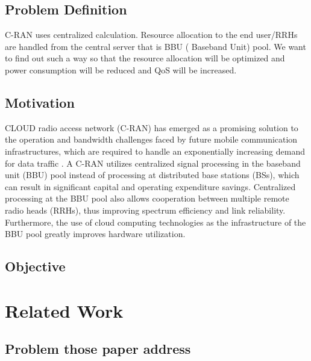 \documentclass{article}
\begin{document}
\subsection{Problem Definition}
C-RAN uses centralized calculation. Resource allocation to the end user/RRHs are handled from the central server that is BBU ( Baseband Unit) pool. We want to find out such a way so that the resource allocation will be optimized and power consumption will be reduced and QoS will be increased.
\subsection{Motivation}
CLOUD radio access network (C-RAN) has emerged as a promising solution to the operation and bandwidth challenges faced by future mobile communication infrastructures, which are required to handle an exponentially increasing demand for data traffic . A C-RAN utilizes centralized signal processing in the baseband unit (BBU) pool instead of processing at distributed base stations (BSs), which can result in significant capital and operating expenditure savings. Centralized processing at the BBU pool also allows cooperation between multiple remote radio heads (RRHs), thus improving spectrum efficiency and link reliability. Furthermore, the use of cloud computing technologies as the infrastructure of the BBU pool greatly improves hardware utilization.
\subsection{Objective}
\section{Related Work}
\subsection{Problem those paper address}
\end{document}

